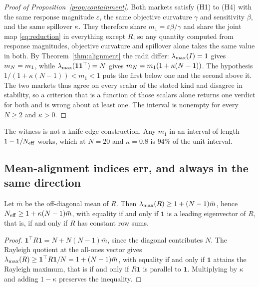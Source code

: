 \begin{proof}[Proof of Proposition~\ref{prop:containment}]
Both markets satisfy (H1) to (H4) with the same response magnitude $\varepsilon$, the same objective curvature $\gamma$ and sensitivity $\beta$, and the same spillover $\kappa$. They therefore share $m_1 = \varepsilon\beta/\gamma$ and share the joint map \eqref{eq:reduction} in everything except $R$, so any quantity computed from response magnitudes, objective curvature and spillover alone takes the same value in both. By Theorem~\ref{thm:alignment} the radii differ: $\lambda_{\max}(I) = 1$ gives $m_N = m_1$, while $\lambda_{\max}(\mathbf{1}\mathbf{1}^{\top}) = N$ gives $m_N = m_1(1+\kappa(N-1))$. The hypothesis $1/(1+\kappa(N-1)) < m_1 < 1$ puts the first below one and the second above it. The two markets thus agree on every scalar of the stated kind and disagree in stability, so a criterion that is a function of those scalars alone returns one verdict for both and is wrong about at least one. The interval is nonempty for every $N \geq 2$ and $\kappa > 0$.
\end{proof}

The witness is not a knife-edge construction. Any $m_1$ in an interval of length $1 - 1/N_{\mathrm{eff}}$ works, which at $N = 20$ and $\kappa = 0.8$ is $94\%$ of the unit interval.

\subsection{Mean-alignment indices err, and always in the same direction}

\begin{aproposition}
\label{aprop:mean}
Let $\bar{m}$ be the off-diagonal mean of $R$. Then $\lambda_{\max}(R) \geq 1 + (N-1)\bar{m}$, hence $N_{\mathrm{eff}} \geq 1 + \kappa(N-1)\bar{m}$, with equality if and only if $\mathbf{1}$ is a leading eigenvector of $R$, that is, if and only if $R$ has constant row sums.
\end{aproposition}

\begin{proof}
$\mathbf{1}^{\top}R\mathbf{1} = N + N(N-1)\bar{m}$, since the diagonal contributes $N$. The Rayleigh quotient at the all-ones vector gives $\lambda_{\max}(R) \geq \mathbf{1}^{\top}R\mathbf{1}/N = 1 + (N-1)\bar{m}$, with equality if and only if $\mathbf{1}$ attains the Rayleigh maximum, that is if and only if $R\mathbf{1}$ is parallel to $\mathbf{1}$. Multiplying by $\kappa$ and adding $1-\kappa$ preserves the inequality.
\end{proof}

